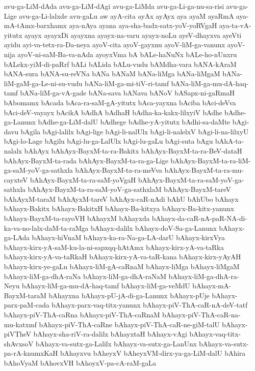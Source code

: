 {avu-ga-LiM-dAda
avu-ga-LiM-dAgi
avu-ga-LiMda
avu-ga-Li-ga-nu-sa-risi
avu-ga-Lige
avu-ga-Li-lalxde
avu-gaLu
aw
ayA-cita
ayAx
ayAyx
aya
ayaM
ayaRmA
aya-mA-tAmx-barxhamx
aya-nAya
ayana
aya-sha-badx-satx-yoV-yoRVgaH
aya-ta-vA-yitutx
ayayx
ayayxDi
ayayxna
ayayx-na-varu
ayayx-noLu
ayeV-dhayxva
ayeVti
ayidu
ayi-va-tetx-ra-Da-neya
ayoV-cita
ayoV-gayxnu
ayoV-liM-ga-vanunx
ayoV-nija
ayoV-ni-saM-Ba-va-nAda
ayoyxVma
bA
bALe-haNuNx
bALe-ho-nUnxru
bALekx-yiM-di-paRrf
bALi
bALida
bALu-vudu
bAMdha-vara
bANA-kAraM
bANA-sura
bANA-su-reVNa
bANa
bANaM
bANa-liMga
bANa-liMgaM
bANa-liM-gaM-ga-Le-ni-su-vudu
bANa-liM-ga-mi-tiV-ri-tamf
bANa-liM-ga-mu-dA-haq-tamf
bANa-liM-ga-vA-gade
bANa-sava
bANava
bANoV
bASapx-ni-gaRmaH
bAbomamx
bAcada
bAca-ra-saM-gA-yitutx
bAca-yayxna
bAciba
bAci-deVva
bAci-deV-vayayx
bAcikA
bAdhA
bAdhaH
bAdha-ka-kakx-lilxyiV
bAdhe
bAdhe-ga-Lanunx
bAdhe-ga-LiM-dalU
bAdhege
bAdhe-yA-yitutx
bAdhi-sa-daMte
bAgi-davu
bAgila
bAgi-lalilx
bAgi-lige
bAgi-li-nalUlx
bAgi-li-nalelxV
bAgi-li-na-lilxyU
bAgi-lo-Lage
bAgilu
bAgi-lu-ga-LalUlx
bAgi-lu-gaLu
bAgi-suta
bAgu
bAhA-ta-nalalx
bAhAyx
bAhAyx-BayxM-ta-ra-Bakitx
bAhAyx-BayxM-ta-ra-BeV-dataH
bAhAyx-BayxM-ta-rada
bAhAyx-BayxM-ta-ra-ga-Lige
bAhAyx-BayxM-ta-ra-liM-ga-saM-yoV-ga-sathxla
bAhAyx-BayxM-ta-ra-meVva
bAhAyx-BayxM-ta-ra-mu-cayxteV
bAhAyx-BayxM-ta-ra-saM-yoVgaH
bAhAyx-BayxM-ta-ra-saM-yoV-ga-sathxla
bAhAyx-BayxM-ta-ra-saM-yoV-ga-sathxlaM
bAhAyx-BayxM-tareV
bAhAyxM-taraM
bAhAyxM-tareV
bAhAyx-caR-nAdi
bAhU
bAhUbo
bAhayx
bAhayx-Bakitx
bAhayx-BakitxH
bAhayx-Ba-kitxya
bAhayx-Ba-kitx-yanunx
bAhayx-BayxM-ta-rayoVH
bAhayxM
bAhayxda
bAhayx-da-caR-nA-paR-NA-di-ka-va-no-lalx-daM-ta-raMga
bAhayx-dalilx
bAhayx-doV-Sa-ga-Lanunx
bAhayx-ga-LAda
bAhayx-hiVnaM
bAhayx-ka-ra-Na-ga-LA-darU
bAhayx-kirxVya
bAhayx-kirx-yA-saM-ku-la-ni-sapxqq-hAtAmx
bAhayx-kirx-yA-va-taRka
bAhayx-kirx-yA-va-taRkaH
bAhayx-kirx-yA-va-taR-kana
bAhayx-kirx-yAyAH
bAhayx-kirx-ye-gaLu
bAhayx-liM-gA-caRnaM
bAhayx-liMga
bAhayx-liMgaM
bAhayx-liM-ga-dhA-raNa
bAhayx-liM-ga-dhA-raNaM
bAhayx-liM-ga-dhA-ra-Neyu
bAhayx-liM-ga-mu-dA-haq-tamf
bAhayx-liM-ga-veMdU
bAhayx-mA-BayxM-taraM
bAhayxna
bAhayx-pU-jA-di-ga-Lanunx
bAhayx-pUje
bAhayx-parx-paM-cada
bAhayx-parx-vaq-titx-yanunx
bAhayx-piV-ThA-caR-nA-deV-tatf
bAhayx-piV-ThA-caRna
bAhayx-piV-ThA-caRnaM
bAhayx-piV-ThA-caR-na-mu-katxmf
bAhayx-piV-ThA-caRne
bAhayx-piV-ThA-caR-ne-giM-talU
bAhayx-piVTheV
bAhayx-sha-riV-ra-dalilx
bAhayxtaH
bAhayx-vAgi
bAhayx-vaq-titx-shAvxsoV
bAhayx-va-sutx-ga-Lalilx
bAhayx-va-sutx-ga-LanUnx
bAhayx-va-sutx-pa-rA-knumxKaH
bAhayxvu
bAheyxV
bAheyxVM-dirx-ya-ga-LiM-dalU
bAhira
bAhoVyaM
bAhovxVH
bAhoyxV-pa-cA-raM-gaLa
}
